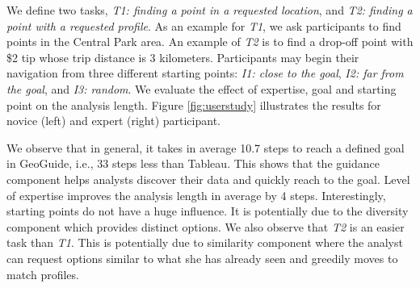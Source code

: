 \documentclass{vldb}
\newcommand{\framework}{{\sc GeoGuide}}
\begin{document}
We define two tasks, {\em T1: finding a point in a requested location}, and {\em T2: finding a point with a requested profile}. As an example for {\em T1}, we ask participants to find points in the Central Park area. An example of {\em T2} is to find a drop-off point with \$2 tip whose trip distance is 3 kilometers. Participants may begin their navigation from three different starting points: {\em I1: close to the goal}, {\em I2: far from the goal}, and {\em I3: random}. We evaluate the effect of expertise, goal and starting point on the analysis length. Figure \ref{fig:userstudy} illustrates the results for novice (left) and expert (right) participant.

We observe that in general, it takes in average 10.7 steps to reach a defined goal in \framework, i.e., 33 steps less than {\sc Tableau}. This shows that the guidance component helps analysts discover their data and quickly reach to the goal. Level of expertise improves the analysis length in average by 4 steps. Interestingly, starting points do not have a huge influence. It is potentially due to the diversity component which provides distinct options. We also observe that {\em T2} is an easier task than {\em T1}. This is potentially due to similarity component where the analyst can request options similar to what she has already seen and greedily moves to match profiles.
\end{document}
